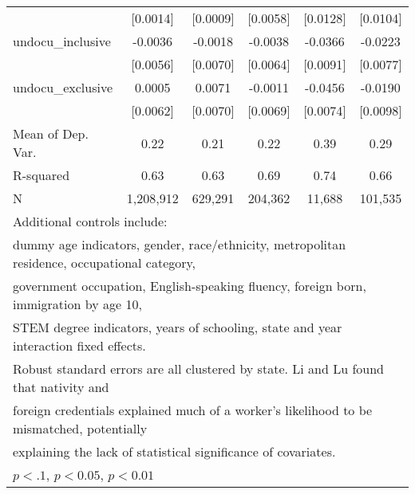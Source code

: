 \begin{table}[htbp]
\begin{tabular}{l*{5}{c}}
                    &    [0.0014]         &    [0.0009]         &    [0.0058]         &    [0.0128]         &    [0.0104]         \\
\addlinespace
undocu\_inclusive    &     -0.0036         &     -0.0018         &     -0.0038         &     -0.0366\sym{***}&     -0.0223\sym{***}\\
                    &    [0.0056]         &    [0.0070]         &    [0.0064]         &    [0.0091]         &    [0.0077]         \\
\addlinespace
undocu\_exclusive    &      0.0005         &      0.0071         &     -0.0011         &     -0.0456\sym{***}&     -0.0190\sym{*}  \\
                    &    [0.0062]         &    [0.0070]         &    [0.0069]         &    [0.0074]         &    [0.0098]         \\
\midrule
Mean of Dep. Var.   &        0.22         &        0.21         &        0.22         &        0.39         &        0.29         \\
R-squared           &        0.63         &        0.63         &        0.69         &        0.74         &        0.66         \\
N                   &   1,208,912         &     629,291         &     204,362         &      11,688         &     101,535         \\
\bottomrule
\multicolumn{6}{l}{\footnotesize Additional controls include:}\\
\multicolumn{6}{l}{\footnotesize dummy age indicators, gender, race/ethnicity, metropolitan residence, occupational category,}\\
\multicolumn{6}{l}{\footnotesize government occupation, English-speaking fluency, foreign born, immigration by age 10,}\\
\multicolumn{6}{l}{\footnotesize STEM degree indicators, years of schooling, state and year interaction fixed effects.}\\
\multicolumn{6}{l}{\footnotesize Robust standard errors are all clustered by state. Li and Lu found that nativity and}\\
\multicolumn{6}{l}{\footnotesize foreign credentials explained much of a worker's likelihood to be mismatched, potentially}\\
\multicolumn{6}{l}{\footnotesize explaining the lack of statistical significance of covariates.}\\
\multicolumn{6}{l}{\footnotesize \sym{*} \(p<.1\), \sym{**} \(p<0.05\), \sym{***} \(p<0.01\)}\\
\end{tabular}
\end{table}

